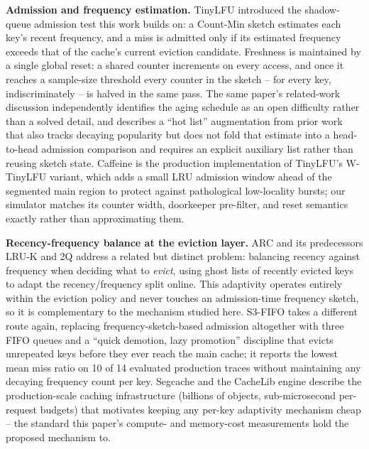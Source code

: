 \documentclass[11pt,letterpaper]{article}
\begin{document}
\textbf{Admission and frequency estimation.} TinyLFU \citep{Einziger2017} introduced the shadow-queue admission test this work builds on: a Count-Min sketch estimates each key's recent frequency, and a miss is admitted only if its estimated frequency exceeds that of the cache's current eviction candidate. Freshness is maintained by a single global reset: a shared counter increments on every access, and once it reaches a sample-size threshold every counter in the sketch -- for every key, indiscriminately -- is halved in the same pass. The same paper's related-work discussion independently identifies the aging schedule as an open difficulty rather than a solved detail, and describes a ``hot list'' augmentation from prior work that also tracks decaying popularity but does not fold that estimate into a head-to-head admission comparison and requires an explicit auxiliary list rather than reusing sketch state. Caffeine is the production implementation of TinyLFU's W-TinyLFU variant, which adds a small LRU admission window ahead of the segmented main region to protect against pathological low-locality bursts; our simulator matches its counter width, doorkeeper pre-filter, and reset semantics exactly rather than approximating them.

\textbf{Recency-frequency balance at the eviction layer.} ARC \citep{Megiddo2003} and its predecessors LRU-K \citep{ONeil1993} and 2Q \citep{Johnson1994} address a related but distinct problem: balancing recency against frequency when deciding what to \emph{evict}, using ghost lists of recently evicted keys to adapt the recency/frequency split online. This adaptivity operates entirely within the eviction policy and never touches an admission-time frequency sketch, so it is complementary to the mechanism studied here. S3-FIFO \citep{Yang2023} takes a different route again, replacing frequency-sketch-based admission altogether with three FIFO queues and a ``quick demotion, lazy promotion'' discipline that evicts unrepeated keys before they ever reach the main cache; it reports the lowest mean miss ratio on 10 of 14 evaluated production traces without maintaining any decaying frequency count per key. Segcache \citep{Yang2021} and the CacheLib engine \citep{Berg2020} describe the production-scale caching infrastructure (billions of objects, sub-microsecond per-request budgets) that motivates keeping any per-key adaptivity mechanism cheap -- the standard this paper's compute- and memory-cost measurements hold the proposed mechanism to.
\end{document}
